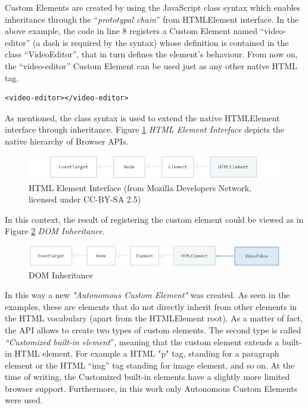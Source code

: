 Custom Elements are created by using the JavaScript class syntax which enables inheritance through the “\emph{prototypal chain}” from HTMLElement interface. In the above example, the code in line 8 registers a Custom Element named “video-editor” (a dash is required by the syntax) whose definition is contained in the class “VideoEditor”, that in turn defines the element’s behaviour.
From now on, the “video-editor” Custom Element can be used just as any other native HTML tag.
\\
\begin{lstlisting}[caption={Custom Element usage},label={codeCustomElemUse}, language=HTML5, numbers=none]
<video-editor></video-editor>
\end{lstlisting}

As mentioned, the class syntax is used to extend the native HTMLElement interface through inheritance. Figure \ref{fig:HTMLInheritance1} \emph{HTML Element Interface} depicts the native hierarchy of Browser APIs.

\begin{figure}[H]
\centering
\includegraphics[width=1\textwidth]{images/HTMLElement - Web APIs MDN.png}
\caption{HTML Element Interface (from Mozilla Developers Network, licensed under CC-BY-SA 2.5)}
\label{fig:HTMLInheritance1}
\end{figure}

In this context, the result of registering the custom element could be viewed as in Figure \ref{fig:HTMLInheritance2} \emph{DOM Inheritance}.

\begin{figure}[H]
\centering
\includegraphics[width=1\textwidth]{images/inherit.jpg}
\caption{DOM Inheritance}
\label{fig:HTMLInheritance2}
\end{figure}

In this way a new \emph{"Autonomous Custom Element"} was created. As seen in the examples, these are elements that do not directly inherit from other elements in the HTML vocabulary (apart from the HTMLElement root). As a matter of fact, the API allows to create two types of custom elements. The second type is called \emph{“Customized built-in element}”, meaning that the custom element extends a built-in HTML element. For example a HTML "p" tag, standing for a paragraph element or the HTML “img” tag standing for image element, and so on.
At the time of writing, the Customized built-in elements have a slightly more limited browser support. Furthermore, in this work only Autonomous Custom Elements were used. 

